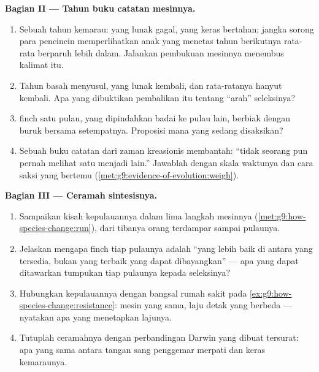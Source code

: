 \begin{problem}
\medskip\noindent\textbf{Bagian II --- Tahun buku
catatan mesinnya.}
\begin{enumerate}[resume]
  \item Sebuah tahun kemarau:  yang lunak gagal, 
        yang keras bertahan; jangka sorong para pencincin
        memperlihatkan anak yang menetas tahun berikutnya
        rata-rata berparuh lebih dalam. Jalankan pembukuan
        mesinnya menembus kalimat itu.
  \item Tahun basah menyusul,  yang lunak kembali, dan
        rata-ratanya hanyut kembali. Apa yang dibuktikan
        pembalikan itu tentang ``arah'' seleksinya?
  \item {} finch satu pulau, yang dipindahkan badai ke
        pulau lain, berbiak dengan buruk bersama 
        setempatnya. Proposisi mana yang sedang disaksikan?
  \item Sebuah buku catatan dari zaman kreasionis membantah:
        ``tidak seorang pun pernah melihat satu 
        menjadi  lain.'' Jawablah dengan skala
        waktunya dan cara saksi yang bertemu
        (\cref{met:g9:evidence-of-evolution:weigh}).
\end{enumerate}

\medskip\noindent\textbf{Bagian III --- Ceramah
sintesisnya.}
\begin{enumerate}[resume]
  \item Sampaikan kisah kepulauannya dalam lima langkah
        mesinnya (\cref{met:g9:how-species-change:run}),
        dari tibanya orang terdampar sampai  pulaunya.
  \item Jelaskan mengapa  finch tiap pulaunya adalah
        ``yang lebih baik di antara yang tersedia, bukan yang
        terbaik yang dapat dibayangkan'' --- apa yang dapat
        ditawarkan tumpukan tiap pulaunya kepada seleksinya?
  \item Hubungkan kepulauannya dengan bangsal rumah sakit
        pada \cref{ex:g9:how-species-change:resistance}:
        mesin yang sama, laju detak yang berbeda ---
        nyatakan apa yang menetapkan lajunya.
  \item Tutuplah ceramahnya dengan perbandingan Darwin yang
        dibuat tersurat: apa yang sama antara tangan sang
        penggemar merpati dan  keras kemaraunya.
\end{enumerate}
\end{problem}
